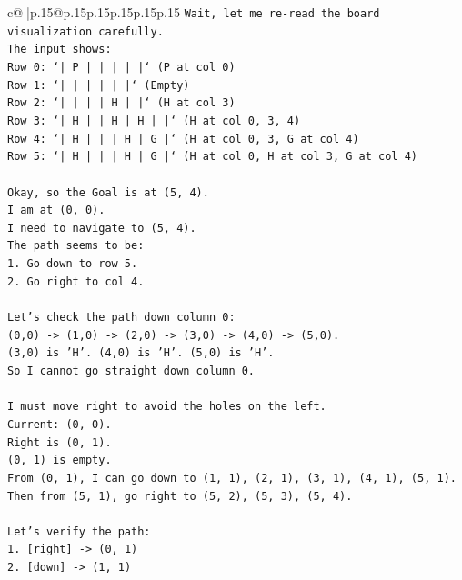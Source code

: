\documentclass{article}
\begin{document}
{\begin{supertabular}{c@{$\;$}|p{.15\linewidth}@{}p{.15\linewidth}p{.15\linewidth}p{.15\linewidth}p{.15\linewidth}p{.15\linewidth}}
{{{\texttt{Wait, let me re{-}read the board visualization carefully.} \\
\texttt{The input shows:} \\
\texttt{Row 0: `|  P  |     |     |     |     |` (P at col 0)} \\
\texttt{Row 1: `|     |     |     |     |     |` (Empty)} \\
\texttt{Row 2: `|     |     |     |  H  |     |` (H at col 3)} \\
\texttt{Row 3: `|  H  |     |  H  |  H  |     |` (H at col 0, 3, 4)} \\
\texttt{Row 4: `|  H  |     |     |  H  |  G  |` (H at col 0, 3, G at col 4)} \\
\texttt{Row 5: `|  H  |     |     |  H  |  G  |` (H at col 0, H at col 3, G at col 4)} \\
\\ 
\texttt{Okay, so the Goal is at (5, 4).} \\
\texttt{I am at (0, 0).} \\
\texttt{I need to navigate to (5, 4).} \\
\texttt{The path seems to be:} \\
\texttt{1. Go down to row 5.} \\
\texttt{2. Go right to col 4.} \\
\\ 
\texttt{Let's check the path down column 0:} \\
\texttt{(0,0) {-}> (1,0) {-}> (2,0) {-}> (3,0) {-}> (4,0) {-}> (5,0).} \\
\texttt{(3,0) is 'H'. (4,0) is 'H'. (5,0) is 'H'.} \\
\texttt{So I cannot go straight down column 0.} \\
\\ 
\texttt{I must move right to avoid the holes on the left.} \\
\texttt{Current: (0, 0).} \\
\texttt{Right is (0, 1).} \\
\texttt{(0, 1) is empty.} \\
\texttt{From (0, 1), I can go down to (1, 1), (2, 1), (3, 1), (4, 1), (5, 1).} \\
\texttt{Then from (5, 1), go right to (5, 2), (5, 3), (5, 4).} \\
\\ 
\texttt{Let's verify the path:} \\
\texttt{1. {[}right{]} {-}> (0, 1)} \\
\texttt{2. {[}down{]} {-}> (1, 1)} \\
}}}
\end{supertabular}}
\end{document}
